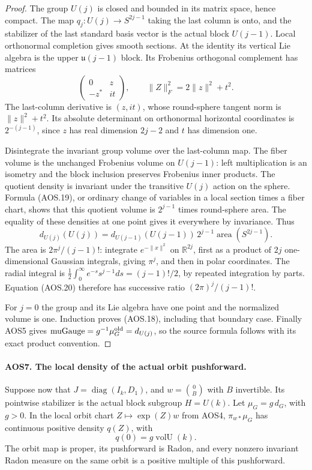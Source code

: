 \begin{proof}
The group $U(j)$ is closed and bounded in its matrix space, hence
compact.  The map $q_j:U(j)\to S^{2j-1}$ taking the last column is
onto, and the stabilizer of the last standard basis vector is the
actual block $U(j-1)$.  Local orthonormal completion gives smooth
sections.  At the identity its vertical Lie algebra is the upper
$\mathfrak u(j-1)$ block.  Its Frobenius orthogonal complement has
matrices
\[
       \begin{pmatrix}0&z\\-z^*&it\end{pmatrix},
       \qquad \|Z\|_F^2=2\|z\|^2+t^2.
 \tag{AOS.19}
\]
The last-column derivative is $(z,it)$, whose round-sphere tangent
norm is $\|z\|^2+t^2$.  Its absolute determinant on orthonormal
horizontal coordinates is $2^{-(j-1)}$, since $z$ has real
dimension $2j-2$ and $t$ has dimension one.

Disintegrate the invariant group volume over the last-column map.
The fiber volume is the unchanged Frobenius volume on $U(j-1)$:
left multiplication is an isometry and the block inclusion preserves
Frobenius inner products.  The quotient density is invariant under
the transitive $U(j)$ action on the sphere.  Formula (AOS.19), or
ordinary change of variables in a local section times a fiber chart,
shows that this quotient volume is $2^{j-1}$ times round-sphere
area.  The equality of these densities at one point gives it
everywhere by invariance.  Thus
\[
 d_{U(j)}(U(j))
      =d_{U(j-1)}(U(j-1))\,2^{j-1}
                        \operatorname{area}(S^{2j-1}).
 \tag{AOS.20}
\]
The area is $2\pi^j/(j-1)!$: integrate $e^{-\|x\|^2}$ on
$\mathbb R^{2j}$, first as a product of $2j$ one-dimensional
Gaussian integrals, giving $\pi^j$, and then in polar coordinates.
The radial integral is
$\tfrac12\int_0^\infty e^{-s}s^{j-1}ds=(j-1)!/2$, by repeated
integration by parts.  Equation (AOS.20) therefore has successive
ratio $(2\pi)^j/(j-1)!$.

For $j=0$ the group and its Lie algebra have one point and the
normalized volume is one.  Induction proves (AOS.18), including
that boundary case.  Finally AOS5 gives
$\operatorname{muGauge}=g^{-1}\mu_G^{\rm old}=d_{U(j)}$,
so the source formula follows with its exact product convention.
\end{proof}

\paragraph{AOS7. The local density of the actual orbit pushforward.}
\label{claim:AOS7}
Suppose now that $J=\operatorname{diag}(I_k,D_1)$, and
$w=\binom{0}{B}$ with $B$ invertible.  Its pointwise stabilizer is
the actual block subgroup $H=U(k)$.  Let $\mu_G=g\,d_G$, with
$g>0$.  In the local orbit chart $Z\mapsto\exp(Z)w$ from AOS4,
$\pi_{w*}\mu_G$ has continuous positive density $q(Z)$, with
\[
                         q(0)=g\operatorname{volU}(k).
 \tag{AOS.21}
\]
The orbit map is proper, its pushforward is Radon, and every nonzero
invariant Radon measure on the same orbit is a positive multiple of
this pushforward.

